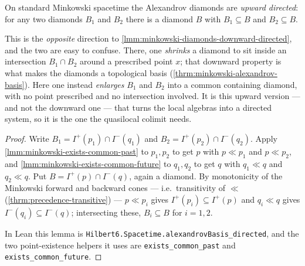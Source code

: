 \medskip

\begin{lemma}
    \label{lmm:minkowski-diamonds-upward-directed}
    \leanok
    On standard Minkowski spacetime the Alexandrov diamonds are \emph{upward directed}: for any two diamonds $B_1$ and $B_2$ there is a diamond $B$ with $B_1 \subseteq B$ and $B_2 \subseteq B$.

    This is the \emph{opposite} direction to \ref{lmm:minkowski-diamonds-downward-directed}, and the two are easy to confuse. There, one \emph{shrinks} a diamond to sit inside an intersection $B_1 \cap B_2$ around a prescribed point $x$; that downward property is what makes the diamonds a topological basis (\ref{thrm:minkowski-alexandrov-basis}). Here one instead \emph{enlarges} $B_1$ and $B_2$ into a common containing diamond, with no point prescribed and no intersection involved. It is this upward version --- and not the downward one --- that turns the local algebras into a directed system, so it is the one the quasilocal colimit needs.
\end{lemma}
\begin{proof}
    \leanok
    Write $B_1 = I^+(p_1) \cap I^-(q_1)$ and $B_2 = I^+(p_2) \cap I^-(q_2)$. Apply \ref{lmm:minkowski-exists-common-past} to $p_1, p_2$ to get $p$ with $p \ll p_1$ and $p \ll p_2$, and \ref{lmm:minkowski-exists-common-future} to $q_1, q_2$ to get $q$ with $q_1 \ll q$ and $q_2 \ll q$. Put $B = I^+(p) \cap I^-(q)$, again a diamond. By monotonicity of the Minkowski forward and backward cones --- i.e.\ transitivity of $\ll$ (\ref{thrm:precedence-transitive}) --- $p \ll p_i$ gives $I^+(p_i) \subseteq I^+(p)$ and $q_i \ll q$ gives $I^-(q_i) \subseteq I^-(q)$; intersecting these, $B_i \subseteq B$ for $i = 1, 2$.

    In Lean this lemma is \texttt{Hilbert6.Spacetime.alexandrovBasis\_directed}, and the two point-existence helpers it uses are \texttt{exists\_common\_past} and \texttt{exists\_common\_future}.
\end{proof}

\medskip

